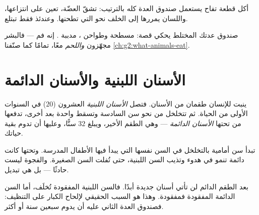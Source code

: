 \begin{example}\label{ex:g2:teeth-and-eating-well:apple}
أكل قطعة تفاح يستعمل صندوق العدة كله بالترتيب:  تشقّ
العضّة،  تعين على انتزاعها، واللسان يمررها إلى الخلف نحو
 التي تطحنها. وعندئذ فقط تبتلع.
\end{example}

\begin{remark}\label{rem:g2:teeth-and-eating-well:animals}
صندوق عدتك المختلط يحكي قصة:  مسطحة وطواحن ، 
مدببة . إنه فم  --- فالبشر مجهّزون  \emph{واللحم}
معًا، تمامًا كما صنّفنا \cref{ch:g2:what-animals-eat}.
\end{remark}

\section{الأسنان اللبنية والأسنان الدائمة}

\begin{proposition}\label{prop:g2:teeth-and-eating-well:sets}
ينبت للإنسان طقمان من الأسنان. فتصل \emph{الأسنان
اللبنية} العشرون ($20$) في السنوات الأولى من
الحياة. ثم تتخلخل من نحو سن السادسة وتسقط واحدة بعد أخرى، تدفعها
من تحتها \emph{الأسنان الدائمة} --- وهي الطقم
الأخير، ويبلغ $32$ سنًّا، وعليها أن تدوم بقية حياتك.
\end{proposition}
\admitted

\begin{example}\label{ex:g2:teeth-and-eating-well:wobbly}
تبدأ سن أمامية بالتخلخل في السن نفسها التي يبدأ فيها الأطفال
المدرسة. وتحتها كانت  دائمة تنمو في هدوء وتذيب  السن
اللبنية، حتى تُفلت السن الصغيرة. والفجوة ليست حادثًا --- بل هي
تبديل.
\end{example}

\begin{remark}\label{rem:g2:teeth-and-eating-well:nothird}
بعد الطقم الدائم لن تأتي أسنان جديدة أبدًا. فالسن اللبنية
المفقودة تُخلَف، أما السن الدائمة المفقودة فمفقودة. وهذا هو السبب
الحقيقي لإلحاح الكبار على التنظيف: فصندوق العدة الثاني عليه أن
يدوم سبعين سنة أو أكثر.
\end{remark}

